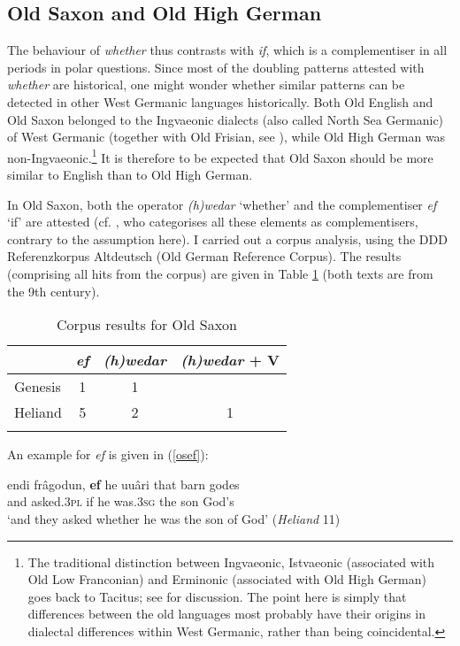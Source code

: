 \subsection{Old Saxon and Old High German} \label{sec:3german}
The behaviour of \textit{whether} thus contrasts with \textit{if}, which is a complementiser in all periods in polar questions. Since most of the doubling patterns attested with \textit{whether} are historical, one might wonder whether similar patterns can be detected in other West Germanic languages historically. Both Old English and Old Saxon belonged to the Ingvaeonic dialects (also called North Sea Germanic) of West Germanic (together with Old Frisian, see \citealt[14]{lass1994}), while Old High German was non-Ingvaeonic.\footnote{The traditional distinction between Ingvaeonic, Istvaeonic (associated with Old Low Franconian) and Erminonic (associated with Old High German) goes back to Tacitus; see \citet[14--15]{lass1994} for discussion. The point here is simply that differences between the old languages most probably have their origins in dialectal differences within West Germanic, rather than being coincidental.} It is therefore to be expected that Old Saxon should be more similar to English than to Old High German. 

In Old Saxon, both the operator \textit{(h)wedar} `whether' and the complementiser \textit{ef} `if' are attested (cf. \citealt{axel2007}, who categorises all these elements as complementisers, contrary to the assumption here). I carried out a corpus analysis, using the DDD Referenzkorpus Altdeutsch (Old German Reference Corpus). The results (comprising all hits from the corpus) are given in Table \ref{tableoldsaxon} (both texts are from the 9th century).

\begin{table}
\begin{tabular}{lccc}
\lsptoprule
{} & \textit{ef} & \textit{(h)wedar} & \textit{(h)wedar} + V\\\midrule
Genesis & 1 & 1 & {}\\
Heliand & 5 & 2 & 1\\
\lspbottomrule
\end{tabular}
\caption{Corpus results for Old Saxon}
\label{tableoldsaxon}
\end{table}

An example for \textit{ef} is given in (\ref{osef}):

\ea \gll endi frâgodun, \textbf{ef} he uuâri that barn godes \label{osef}\\
and asked.\textsc{3pl} if he was.\textsc{3sg} the son God's\\
\glt `and they asked whether he was the son of God' (\textit{Heliand} 11)
\z
  
